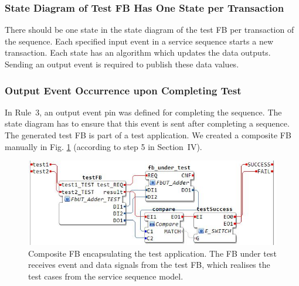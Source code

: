 \documentclass[conference]{IEEEtran}
\begin{document}
\subsubsection{State Diagram of Test FB Has One State per Transaction}%
There should be one state in the state diagram of the test FB per transaction of the sequence. Each specified input event in a service sequence starts a new transaction. Each state has an algorithm which updates the data outputs. Sending an output event is required to publish these data values.

\subsubsection{Output Event Occurrence upon Completing Test}
In Rule~3, an output event pin was defined for completing the sequence. The state diagram has to ensure that this event is sent after completing a sequence.
The generated test FB is part of a test application. We created a composite FB manually in Fig. \ref{fig:compfb} (according to step 5 in Section~IV).
\begin{figure}[b!]
    \centering
    \includegraphics[width=\columnwidth]{Figures/compositeFb.JPG}
    \caption{Composite FB encapsulating the test application. The FB under test receives event and data signals from the test FB, which realises the test cases from the service sequence model.}
    \label{fig:compfb}
\end{figure}
\end{document}
